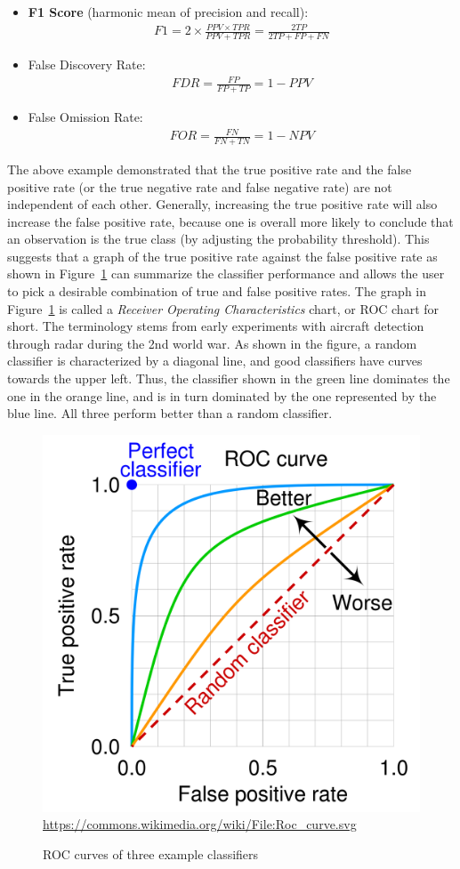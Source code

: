 \begin{itemize}
   \item \textbf{F1 Score} (harmonic mean of precision and recall):
\begin{align*}
F1 = 2 \times \frac{PPV \times TPR}{PPV + TPR} = \frac{2 TP}{2TP + FP + FN}
\end{align*}
   \item False Discovery Rate:
\begin{align*}
FDR = \frac{FP}{FP+TP} = 1 - PPV
\end{align*}
   \item False Omission Rate:
\begin{align*}
FOR = \frac{FN}{FN+TN} = 1 - NPV
\end{align*}
\end{itemize}

The above example demonstrated that the true positive rate and the false positive rate (or the true negative rate and false negative rate) are not independent of each other. Generally, increasing the true positive rate will also increase the false positive rate, because one is overall more likely to conclude that an observation is the true class (by adjusting the probability threshold). This suggests that a graph of the true positive rate against the false positive rate as shown in Figure~\ref{fig:roc} can summarize the classifier performance and allows the user to pick a desirable combination of true and false positive rates. The graph in Figure~\ref{fig:roc} is called a \emph{Receiver Operating Characteristics} chart, or ROC chart for short. The terminology stems from early experiments with aircraft detection through radar during the 2nd world war. As shown in the figure, a random classifier is characterized by a diagonal line, and good classifiers have curves towards the upper left. Thus, the classifier shown in the green line dominates the one in the orange line, and is in turn dominated by the one represented by the blue line. All three perform better than a random classifier.

\begin{figure}
\centering
\includegraphics[width=.5\textwidth]{roc.png}
\scriptsize \url{https://commons.wikimedia.org/wiki/File:Roc_curve.svg}
\caption{ROC curves of three example classifiers}
\label{fig:roc}
\end{figure}

